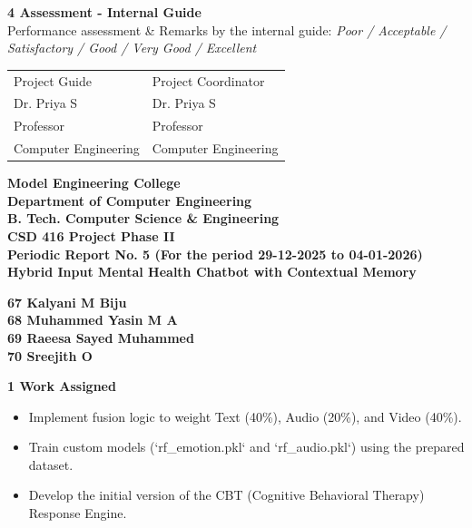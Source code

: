 \documentclass[12pt,a4paper]{article}
\begin{document}
\noindent\textbf{4 \quad Assessment - Internal Guide}\\[0.5em]
Performance assessment \& Remarks by the internal guide: \textit{Poor / Acceptable /}\\
\textit{Satisfactory / Good / Very Good / Excellent}\\[3em]

\noindent
\begin{tabular}{p{} p{}}
Project Guide & Project Coordinator\\[0.5em]
Dr. Priya S & Dr. Priya S\\
Professor & Professor\\
Computer Engineering & Computer Engineering\\
\end{tabular}

\vfill
\newpage


\begin{center}
{\Large \textbf{Model Engineering College}}\\[0.2em]
{\large \textbf{Department of Computer Engineering}}\\[0.2em]
{\large \textbf{B. Tech. Computer Science \& Engineering}}\\[0.2em]
{\large \textbf{CSD 416 Project Phase II}}\\[1em]
{\large \textbf{Periodic Report No. 5 (For the period 29-12-2025 to 04-01-2026)}}\\[1.5em]

{\Large \textbf{Hybrid Input Mental Health Chatbot with Contextual Memory}}\\[0.2em]

\end{center}

\begin{center}
\textbf{67  Kalyani M Biju\\
68 Muhammed Yasin M A\\
69 Raeesa Sayed Muhammed\\
70 Sreejith O\\[1.5em]}
\end{center}

\noindent\textbf{1 \quad Work Assigned}
\begin{itemize}
    \item Implement fusion logic to weight Text (40\%), Audio (20\%), and Video (40\%).
    \item Train custom models (`rf_emotion.pkl` and `rf_audio.pkl`) using the prepared dataset.
    \item Develop the initial version of the CBT (Cognitive Behavioral Therapy) Response Engine.
\end{itemize}
\end{document}
